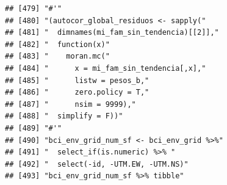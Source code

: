 \documentclass[11pt,]{article}
\begin{document}
\begin{verbatim}
## [479] "#'"                                                                                                                                                                    
## [480] "(autocor_global_residuos <- sapply("                                                                                                                                   
## [481] "  dimnames(mi_fam_sin_tendencia)[[2]],"                                                                                                                                
## [482] "  function(x)"                                                                                                                                                         
## [483] "    moran.mc("                                                                                                                                                         
## [484] "      x = mi_fam_sin_tendencia[,x],"                                                                                                                                   
## [485] "      listw = pesos_b,"                                                                                                                                                
## [486] "      zero.policy = T,"                                                                                                                                                
## [487] "      nsim = 9999),"                                                                                                                                                   
## [488] "  simplify = F))"                                                                                                                                                      
## [489] "#'"                                                                                                                                                                    
## [490] "bci_env_grid_num_sf <- bci_env_grid %>%"                                                                                                                               
## [491] "  select_if(is.numeric) %>% "                                                                                                                                          
## [492] "  select(-id, -UTM.EW, -UTM.NS)"                                                                                                                                       
## [493] "bci_env_grid_num_sf %>% tibble"                                                                                                                                        

\end{verbatim}
\end{document}
